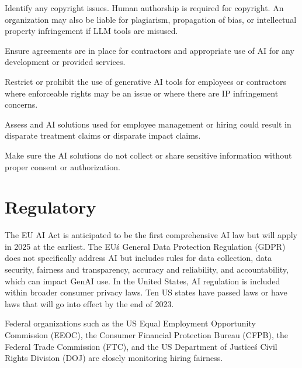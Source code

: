 \begin{minipage}{\linewidth}
\begin{checklist}
  \item Identify any copyright issues. Human authorship is required for
  copyright. An organization may also be liable for plagiarism, propagation of
  bias, or intellectual property infringement if LLM tools are misused.
  \item Ensure agreements are in place for contractors and appropriate use of AI
  for any development or provided services.
  \item Restrict or prohibit the use of generative AI tools for employees or
  contractors where enforceable rights may be an issue or where there are IP
  infringement concerns.
  \item Assess and AI solutions used for employee management or hiring could
  result in disparate treatment claims or disparate impact claims.
  \item Make sure the AI solutions do not collect or share sensitive
  information without proper consent or authorization.
\end{checklist}
\end{minipage}

\clearpage

\section{Regulatory}
The EU AI Act is anticipated to be the first comprehensive AI law but will
apply in 2025 at the earliest. The EU\'s General Data Protection Regulation
(GDPR) does not specifically address AI but includes rules for data collection,
data security, fairness and transparency, accuracy and reliability, and
accountability, which can impact GenAI use. In the United States, AI regulation
is included within broader consumer privacy laws. Ten US states have passed
laws or have laws that will go into effect by the end of 2023.

Federal organizations such as the US Equal Employment Opportunity Commission
(EEOC), the Consumer Financial Protection Bureau (CFPB), the Federal Trade
Commission (FTC), and the US Department of Justice\'s Civil Rights Division
(DOJ) are closely monitoring hiring fairness.


